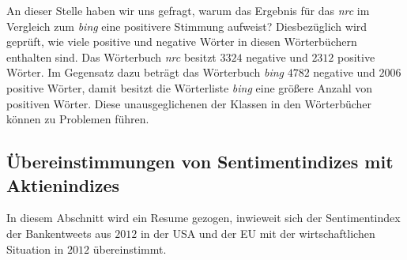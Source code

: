 An dieser Stelle haben wir uns gefragt, warum das Ergebnis für das \textit{nrc} im Vergleich zum \textit{bing} eine positivere Stimmung aufweist? Diesbezüglich wird geprüft, wie viele positive und negative Wörter in diesen Wörterbüchern enthalten sind. Das Wörterbuch \textit{nrc} besitzt $3324$ negative und $2312$ positive Wörter. Im Gegensatz dazu beträgt das Wörterbuch \textit{bing} $4782$ negative und $2006$ positive Wörter, damit besitzt die Wörterliste \textit{bing} eine größere Anzahl von positiven Wörter. Diese unausgeglichenen der Klassen in den Wörterbücher können zu Problemen führen. 

\subsection{Übereinstimmungen von Sentimentindizes mit Aktienindizes}\label{ueberein}
In diesem Abschnitt wird ein Resume gezogen, inwieweit sich der Sentimentindex der Bankentweets aus $2012$ in der USA und der EU mit der wirtschaftlichen Situation in $2012$ übereinstimmt. 


